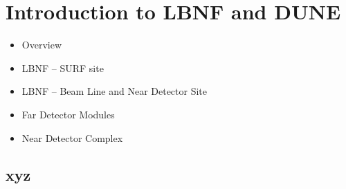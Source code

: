 \chapter{Introduction to LBNF and DUNE}
\label{ch:physics-intro}


\begin{itemize}
\item Overview
\item LBNF -- SURF site
\item LBNF -- Beam Line and Near Detector Site
\item Far Detector Modules
\item Near Detector Complex
\end{itemize}

\section{xyz}
\label{sec:xyz}


